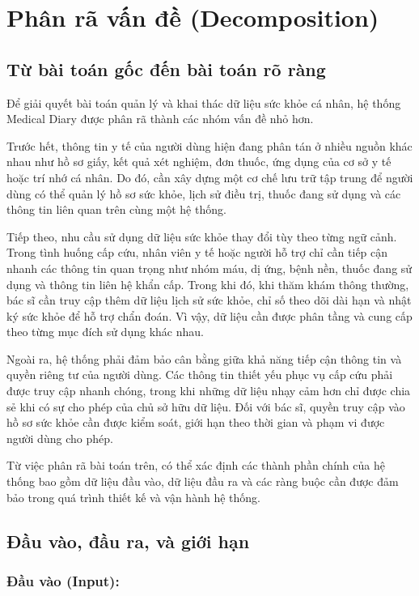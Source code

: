 \documentclass[12pt,a4paper]{report}
\begin{document}
\section{Phân rã vấn đề (Decomposition)}
\subsection{Từ bài toán gốc đến bài toán rõ ràng}
Để giải quyết bài toán quản lý và khai thác dữ liệu sức khỏe cá nhân, hệ thống Medical Diary được phân rã thành các nhóm vấn đề nhỏ hơn.

Trước hết, thông tin y tế của người dùng hiện đang phân tán ở nhiều nguồn khác nhau như hồ sơ giấy, kết quả xét nghiệm, đơn thuốc, ứng dụng của cơ sở y tế hoặc trí nhớ cá nhân. Do đó, cần xây dựng một cơ chế lưu trữ tập trung để người dùng có thể quản lý hồ sơ sức khỏe, lịch sử điều trị, thuốc đang sử dụng và các thông tin liên quan trên cùng một hệ thống.

Tiếp theo, nhu cầu sử dụng dữ liệu sức khỏe thay đổi tùy theo từng ngữ cảnh. Trong tình huống cấp cứu, nhân viên y tế hoặc người hỗ trợ chỉ cần tiếp cận nhanh các thông tin quan trọng như nhóm máu, dị ứng, bệnh nền, thuốc đang sử dụng và thông tin liên hệ khẩn cấp. Trong khi đó, khi thăm khám thông thường, bác sĩ cần truy cập thêm dữ liệu lịch sử sức khỏe, chỉ số theo dõi dài hạn và nhật ký sức khỏe để hỗ trợ chẩn đoán. Vì vậy, dữ liệu cần được phân tầng và cung cấp theo từng mục đích sử dụng khác nhau.

Ngoài ra, hệ thống phải đảm bảo cân bằng giữa khả năng tiếp cận thông tin và quyền riêng tư của người dùng. Các thông tin thiết yếu phục vụ cấp cứu phải được truy cập nhanh chóng, trong khi những dữ liệu nhạy cảm hơn chỉ được chia sẻ khi có sự cho phép của chủ sở hữu dữ liệu. Đối với bác sĩ, quyền truy cập vào hồ sơ sức khỏe cần được kiểm soát, giới hạn theo thời gian và phạm vi được người dùng cho phép.

Từ việc phân rã bài toán trên, có thể xác định các thành phần chính của hệ thống bao gồm dữ liệu đầu vào, dữ liệu đầu ra và các ràng buộc cần được đảm bảo trong quá trình thiết kế và vận hành hệ thống.

\subsection{Đầu vào, đầu ra, và giới hạn}
\subsubsection{Đầu vào (Input):}
\end{document}
